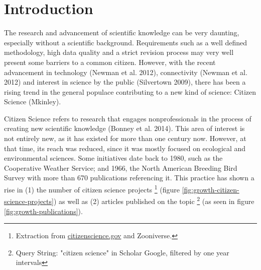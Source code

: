 \chapter*[Introduction]{Introduction}

\publicationdata

The research and advancement of scientific knowledge can be very daunting, especially without a scientific background. Requirements such as a well defined methodology, high data quality and a strict revision process may very well present some barriers to a common citizen. However, with the recent advancement in technology (Newman et al. 2012), connectivity (Newman et al. 2012) and interest in science by the public (Silvertown 2009), there has been a rising trend in the general populace contributing to a new kind of science: Citizen Science (Mkinley).

Citizen Science refers to research that engages nonprofessionals in the process of creating new scientific knowledge (Bonney et al. 2014). This area of interest is not entirely new, as it has existed for more than one century now. However, at that time, its reach was reduced, since it was mostly focused on ecological and environmental sciences. Some initiatives date back to 1980, such as the Cooperative Weather Service; and 1966, the North American Breeding Bird Survey with more than 670 publications referencing it. This practice has shown a rise in (1) the number of citizen science projects \footnote{Extraction from \href{citizenscience.gov}{citizenscience.gov} and Zooniverse.} (figure \ref{fig:growth-citizen-science-projects}) as well as (2) articles published on the topic \footnote{Query String: "citizen science" in Scholar Google, filtered by one year intervals} (as seen in figure \ref{fig:growth-publications}).

